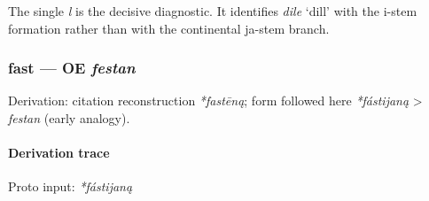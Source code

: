 \documentclass[
  british,
  a4paper,
]{article}
\begin{document}
The single \emph{l} is the decisive diagnostic. It identifies
{\emph{dile}} `dill' with the i-stem formation rather than with the
continental ja-stem branch.

\subsubsection{\texorpdfstring{fast --- OE
\emph{festan}}{fast --- OE festan}}\label{fast-oe-festan}

Derivation: citation reconstruction \emph{*fastēną}; form followed here
\emph{*fástijaną} \textgreater{} \emph{festan} (early analogy).

\paragraph{Derivation trace}\label{derivation-trace-91}

Proto input: \emph{*fástijaną}

\begingroup
\setlength{\fboxsep}{6pt}
\end{document}

